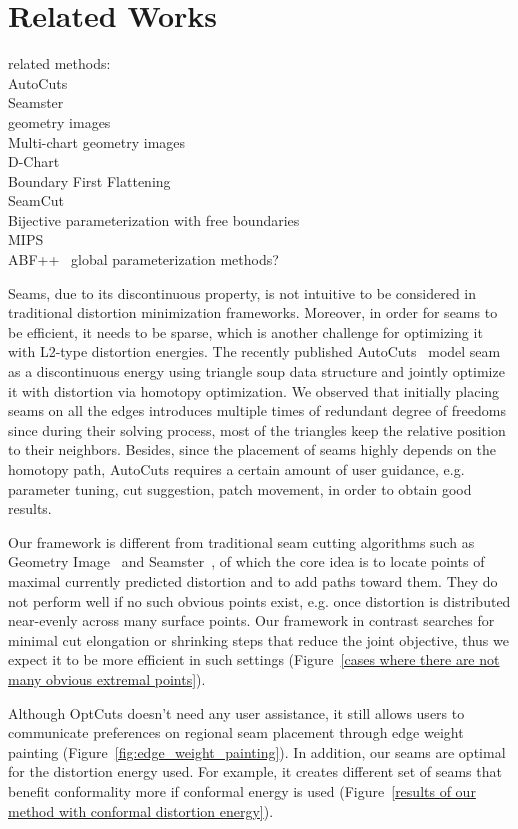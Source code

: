 
\section{Related Works}

related methods:\\
AutoCuts~\cite{Poranne2017Autocuts}\\
Seamster~\cite{Sheffer2002Seamster}\\
geometry images~\cite{Gu2002Geometry}\\
Multi-chart geometry images~\cite{Snyder2003Multi}\\
D-Chart~\cite{Julius2005D}\\
Boundary First Flattening~\cite{Sawhney:2017}\\
SeamCut~\cite{Lucquin:2017}\\
Bijective parameterization with free boundaries~\cite{Smith2015Bijective}\\
MIPS~\cite{Hormann2000MIPS}\\
ABF++~\cite{Sheffer2005ABFPP}
global parameterization methods?

Seams, due to its discontinuous property, is not intuitive to be considered in traditional distortion minimization frameworks. Moreover, in order for seams to be efficient, it needs to be sparse, which is another challenge for optimizing it with L2-type distortion energies. The recently published AutoCuts~\cite{Poranne2017Autocuts} model seam as a discontinuous energy using triangle soup data structure and jointly optimize it with distortion via homotopy optimization. We observed that initially placing seams on all the edges introduces multiple times of redundant degree of freedoms since during their solving process, most of the triangles keep the relative position to their neighbors. Besides, since the placement of seams highly depends on the homotopy path, AutoCuts requires a certain amount of user guidance, e.g. parameter tuning, cut suggestion, patch movement, in order to obtain good results.

Our framework is different from traditional seam cutting algorithms such as Geometry Image~\cite{Gu2002Geometry} and Seamster~\cite{Sheffer2002Seamster}, of which the core idea is to locate points of maximal currently predicted distortion and to add paths toward them. They do not perform well if no such obvious points exist, e.g. once distortion is distributed near-evenly across many surface points. Our framework in contrast searches for minimal cut elongation or shrinking steps that reduce the joint objective, thus we expect it to be more efficient in such settings (Figure~\ref{cases where there are not many obvious extremal points}).

Although OptCuts doesn't need any user assistance, it still allows users to communicate preferences on regional seam placement through edge weight painting (Figure~\ref{fig:edge_weight_painting}).
In addition, our seams are optimal for the distortion energy used. For example, it creates different set of seams that benefit conformality more if conformal energy is used (Figure~\ref{results of our method with conformal distortion energy}).